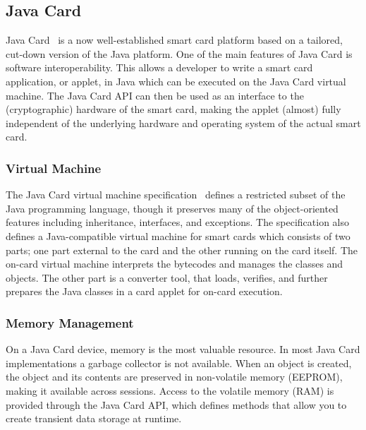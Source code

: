 \subsection{Java Card}\label{sec:javacard}

Java Card~\cite{Chen00} is a now well-established smart card platform based on
a tailored, cut-down version of the Java platform. One of the main features of
Java Card is software interoperability. This allows a developer to write a smart
card application, or applet, in Java which can be executed on the Java Card
virtual machine. The Java Card API can then be used as an interface to the
(cryptographic) hardware of the smart card, making the applet (almost) fully
independent of the underlying hardware and operating system of the actual smart
card.

\subsubsection{Virtual Machine}

The Java Card virtual machine specification~\cite{jcvm222} defines a restricted
subset of the Java programming language, though it preserves many of the
object-oriented features including inheritance, interfaces, and exceptions. The
specification also defines a Java-compatible virtual machine for smart cards
which consists of two parts; one part external to the card and the other running
on the card itself. The on-card virtual machine interprets the bytecodes and
manages the classes and objects. The other part is a converter tool, that loads,
verifies, and further prepares the Java classes in a card applet for on-card
execution.

\subsubsection{Memory Management}

On a Java Card device, memory is the most valuable resource. In most Java Card
implementations a garbage collector is not available. When an object is
created, the object and its contents are preserved in non-volatile memory
(EEPROM), making it available across sessions. Access to the volatile memory
(RAM) is provided through the Java Card API, which defines methods that allow
you to create transient data storage at runtime.

